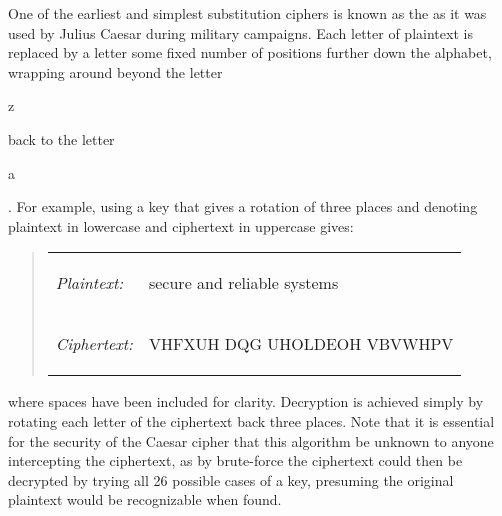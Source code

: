 One of the earliest and simplest substitution ciphers is known as the
 as it was used by Julius Caesar during military campaigns.
Each letter of plaintext is replaced by a letter some fixed number of positions
further down the alphabet, wrapping around beyond the letter \begin{code}z\end{code}
back to the letter \begin{code}a\end{code}.
For example, using a key that gives a rotation of three places and denoting
plaintext in lowercase and ciphertext in uppercase gives:
\begin{quote}\begin{tabular}{ll}
  \emph{Plaintext:} & \begin{code}secure and reliable systems\end{code} \\
  \emph{Ciphertext:}& \begin{code}VHFXUH DQG UHOLDEOH VBVWHPV\end{code}
\end{tabular}\end{quote}
where spaces have been included for clarity.
Decryption is achieved simply by rotating each letter of the ciphertext back three places.
Note that it is essential for the security of the Caesar cipher that this algorithm
be unknown to anyone intercepting the ciphertext, as by brute-force the
ciphertext could then be decrypted by trying all 26 possible cases of a key,
presuming the original plaintext would be recognizable when found.

